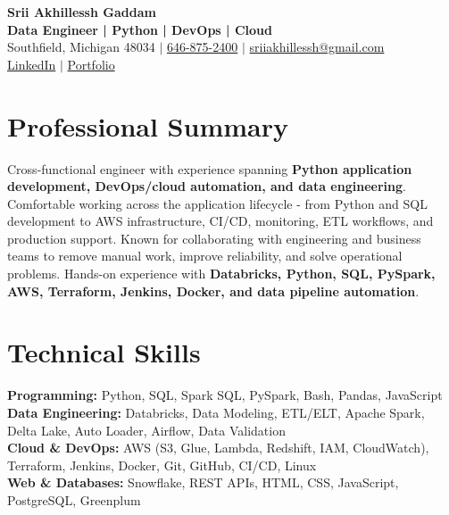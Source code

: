 \documentclass[letterpaper,10pt]{article}
\begin{document}
\fontsize{9.35pt}{10.45pt}\selectfont

\begin{center}
    {\LARGE \textbf{Srii Akhillessh Gaddam}} \\[-1pt]
    \textbf{Data Engineer | Python | DevOps | Cloud} \\[2pt]
    Southfield, Michigan 48034 $|$
    \href{tel:6468752400}{646-875-2400} $|$
    \href{mailto:sriiakhillessh@gmail.com}{sriiakhillessh@gmail.com} \\[1pt]
    \href{https://www.linkedin.com/in/srii-akhiilessh-gaddam-b48668191/}{LinkedIn} $|$
    \href{https://sriiakhillesshg.github.io/portfolio/}{Portfolio}
\end{center}
\vspace{-8pt}

\section{Professional Summary}
\small{Cross-functional engineer with experience spanning \textbf{Python application development, DevOps/cloud automation, and data engineering}. Comfortable working across the application lifecycle - from Python and SQL development to AWS infrastructure, CI/CD, monitoring, ETL workflows, and production support. Known for collaborating with engineering and business teams to remove manual work, improve reliability, and solve operational problems. Hands-on experience with \textbf{Databricks, Python, SQL, PySpark, AWS, Terraform, Jenkins, Docker, and data pipeline automation}.}

\section{Technical Skills}
\small{
\textbf{Programming:} Python, SQL, Spark SQL, PySpark, Bash, Pandas, JavaScript \\
\textbf{Data Engineering:} Databricks, Data Modeling, ETL/ELT, Apache Spark, Delta Lake, Auto Loader, Airflow, Data Validation \\
\textbf{Cloud \& DevOps:} AWS (S3, Glue, Lambda, Redshift, IAM, CloudWatch), Terraform, Jenkins, Docker, Git, GitHub, CI/CD, Linux \\
\textbf{Web \& Databases:} Snowflake, REST APIs, HTML, CSS, JavaScript, PostgreSQL, Greenplum
}

\end{document}
